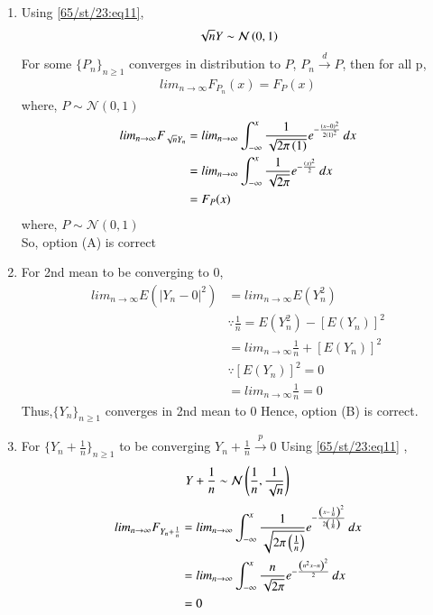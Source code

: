 \documentclass[journal,12pt,Twocolumn]{IEEEtran}
\theoremstyle{remark}
\begin{document}
\begin{enumerate}[label=(\Alph*)]
\item Using \eqref{65/st/23:eq11}, 
\begin{align}
\sqrt{n}Y \sim \mathcal{N}\left(0,1\right) 
\end{align}
For some $\{P_n\}_{n \geq 1}$  converges in distribution to $P$, $P_n \xrightarrow{d} P$, then for all p,
\begin{align}
lim_{n \to \infty} F_{P_n}(x) = F_{P}(x) 
\end{align}
where, $P \sim \mathcal{N}(0,1)$
\begin{align}
lim_{n \to \infty} F_{\sqrt{n}Y_n} 
&= lim_{n \to \infty} \int_{-\infty}^{x} \frac{1}{\sqrt{2\pi\left(1\right)}}e^{-\frac{\left(x-0\right)^2}{2\left(1\right)^2}} \,dx \\
&= lim_{n \to \infty} \int_{-\infty}^{x} \frac{1}{\sqrt{2\pi}}e^{-\frac{\left(x\right)^2}{2}} \,dx \\
&=F_P(x)
\end{align}
where, $P \sim \mathcal{N}(0,1)$ \\
So, option (A) is correct\
\item For 2nd mean to be converging to 0,
\begin{align}
lim_{n \to \infty} E(|Y_n-0|^2)&=lim_{n \to \infty} E(Y_n^2) \\
&\because \frac{1}{n} = E(Y_n^2) - [E(Y_n)]^2 \\
&=lim_{n \to \infty} \frac{1}{n} + [E(Y_n)]^2 \\
&\because [E(Y_n)]^2 = 0 \\
&=lim_{n \to \infty} \frac{1}{n} = 0 
\end{align}
Thus,$\{Y_n\}_{n \geq 1}$ converges in 2nd mean to 0
Hence, option (B) is correct.
\item For $\{Y_n+\frac{1}{n}\}_{n \geq 1}$ to be converging $Y_n +\frac{1}{n} \xrightarrow{p} 0$
Using \eqref{65/st/23:eq11} ,
\begin{align}
Y+\frac{1}{n} \sim \mathcal{N}\left(\frac{1}{n},\frac{1}{\sqrt{n}}\right)
\end{align}  
\begin{align}
lim_{n \to \infty} F_{Y_n+\frac{1}{n}} 
&= lim_{n \to \infty} \int_{-\infty}^{x} \frac{1}{\sqrt{2\pi\left(\frac{1}{n}\right)}}e^{-\frac{\left(x-\frac{1}{n}\right)^2}{2\left(\frac{1}{n}\right)}} \,dx \\
&= lim_{n \to \infty} \int_{-\infty}^{x} \frac{n}{\sqrt{2\pi}}e^{-\frac{\left(n^2x-n\right)^2}{2}} \,dx \\
&= 0
\end{align}

\end{enumerate}
\end{document}
